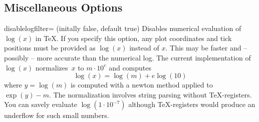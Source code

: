 

\subsection{Miscellaneous Options}
\label{pgfplots:misc}

\begin{pgfplotskey}{disablelogfilter= (initally false, default true)}
Disables numerical evaluation of $\log(x)$ in \TeX. If you specify this option, any plot coordinates and tick positions must be provided as $\log(x)$ instead of $x$. This may be faster and -- possibly -- more accurate than the numerical log. The current implementation of $\log(x)$ normalizes~$x$ to $m\cdot 10^e$ and computes
\[ \log(x) = \log(m) + e \log(10) \]
where $y = \log(m)$ is computed with a newton method applied to $\exp(y) - m$. The normalization involves string parsing without \TeX-registers. You can savely evaluate $\log(1\cdot 10^{-7})$ although \TeX-registers would produce an underflow for such small numbers. 
\end{pgfplotskey}

